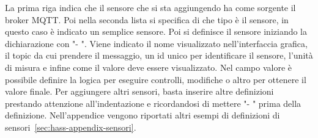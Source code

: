La prima riga indica che il sensore che si sta aggiungendo ha come sorgente il broker MQTT.
Poi nella seconda lista si specifica di che tipo è il sensore, 
in questo caso è indicato un semplice sensore.
Poi si definisce il sensore iniziando la dichiarazione con "- ".
Viene indicato il nome visualizzato nell'interfaccia grafica, il topic da cui prendere il messaggio,
un id unico per identificare il sensore, 
l'unità di misura e infine come il valore deve essere visualizzato.
Nel campo valore è possibile definire la logica per eseguire controlli, modifiche o altro 
per ottenere il valore finale.
Per aggiungere altri sensori, basta inserire altre definizioni prestando attenzione all'indentazione
e ricordandosi di mettere "- " prima della definizione.
Nell'appendice vengono riportati altri esempi di definizioni di sensori~\ref{sec:hass-appendix-sensori}.

